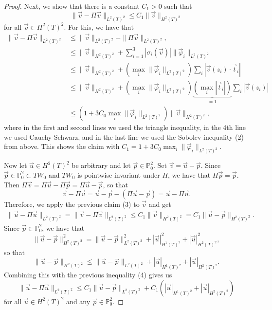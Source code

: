 \documentclass{article}
\begin{document}
\begin{proof}
	Next, we show that there is a constant $C_1 > 0$ such that
	\begin{equation}
		\|\vec v - \Pi\vec v\|_{L^2(T)^2} \leq C_1\|\vec v\|_{H^2(T)^2}
	\end{equation}
	for all $\vec v \in H^2(T)^2$.
	For this, we have that
	\begin{align*}
		\|\vec v - \Pi\vec v\|_{L^2(T)^2} & \leq \|\vec v\|_{L^2(T)^2} + \|\Pi\vec v\|_{L^2(T)^2},                                                                   \\
		                                  & \leq \|\vec v\|_{H^2(T)^2} + \sum_{i=1}^3|\sigma_i(\vec v)|\|\vec\varphi_i\|_{L^2(T)^2}                                  \\
		                                  & \leq \|\vec v\|_{H^2(T)^2} + (\max_i\|\vec\varphi_i\|_{L^2(T)^2})\sum_i|\vec v(z_i)\cdot\vec t_i|                        \\
		                                  & \leq \|\vec v\|_{H^2(T)^2} + (\max_i\|\vec\varphi_i\|_{L^2(T)^2})\underbrace{(\max_i|\vec t_i|)}_{=1}\sum_i|\vec v(z_i)| \\
		                                  & \leq (1 + 3C_0\max_i\|\vec\varphi_i\|_{L^2(T)^2})\|\vec v\|_{H^2(T)^2},
	\end{align*}
	where in the first and second lines we used the triangle inequality, in the 4th line we used Cauchy-Schwarz, and in the last line we used the Sobolev inequality (2) from above.
	This shows the claim with $C_1 = 1 + 3C_0\max_i\|\vec\varphi_i\|_{L^2(T)^2}$.

	Now let $\vec u \in H^2(T)^2$ be arbitrary and let $\vec p \in \mathbb P_0^2$.
	Set $\vec v = \vec u - \vec p$.
	Since $\vec p \in \mathbb P_0^2 \subset TW_0$ and $TW_0$ is pointwise invariant under $\Pi$, we have that $\Pi\vec p = \vec p$.
	Then $\Pi \vec v = \Pi\vec u - \Pi\vec p = \Pi\vec u - \vec p$, so that
	\[\vec v - \Pi\vec v = \vec u - \vec p - (\Pi\vec u - \vec p) = \vec u - \Pi\vec u.\]
	Therefore, we apply the previous claim (3) to $\vec v$ and get
	\begin{align}
		\|\vec u - \Pi\vec u\|_{L^2(T)^2} = \|\vec v - \Pi\vec v\|_{L^2(T)^2} \leq C_1\|\vec v\|_{H^2(T)^2} = C_1\|\vec u - \vec p\|_{H^2(T)^2}.
	\end{align}
	Since $\vec p \in \mathbb P_0^2$, we have that
	\begin{equation*}
		\|\vec u - \vec p\|_{H^2(T)^2}^2 = \|\vec u - \vec p\|_{L^2(T)^2}^2 + |\vec u|_{H^1(T)^2}^2 + |\vec u|_{H^2(T)^2}^2,
	\end{equation*}
	so that
	\begin{equation}
		\|\vec u - \vec p\|_{H^2(T)^2} \leq \|\vec u - \vec p\|_{L^2(T)^2} + |\vec u|_{H^1(T)^2} + |\vec u|_{H^2(T)^2}.
	\end{equation}
	Combining this with the previous inequality (4) gives us
	\begin{equation}
		\|\vec u - \Pi\vec u\|_{L^2(T)^2} \leq C_1\|\vec u - \vec p\|_{L^2(T)^2} + C_1(|\vec u|_{H^1(T)^2} + |\vec u|_{H^2(T)^2})
	\end{equation}
	for all $\vec u \in H^2(T)^2$ and any $\vec p \in \mathbb P_0^2$.


\end{proof}
\end{document}
